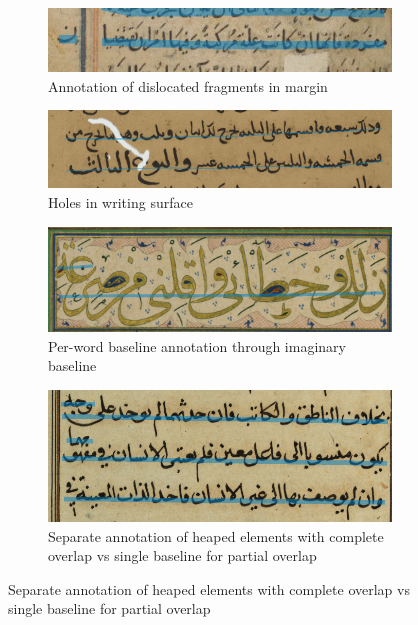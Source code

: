 \begin{figure}
	\centering
	\begin{subfigure}{.48\textwidth}
		\includegraphics[width=\textwidth]{img792_expulsion_anno.jpg}
		\caption{Annotation of dislocated fragments in margin}
		\label{fig:anno_margin}
	\end{subfigure}

	\begin{subfigure}{.48\textwidth}
		\includegraphics[width=\textwidth]{ljs293_holes_anno.jpg}
		\caption{Holes in writing surface}
		\label{fig:anno_holes}
	\end{subfigure}

	\begin{subfigure}{.48\textwidth}
		\includegraphics[width=\textwidth]{w579_pwb_anno.jpg}
		\caption{Per-word baseline annotation through imaginary baseline}
		\label{fig:anno_pwb}
	\end{subfigure}

	\begin{subfigure}{.48\textwidth}
		\includegraphics[width=\textwidth]{w591_stacking_anno.jpg}
		\caption{Separate annotation of heaped elements with complete overlap vs single baseline for partial overlap}
		\label{fig:anno_stacking}
	\end{subfigure}


\end{figure}
